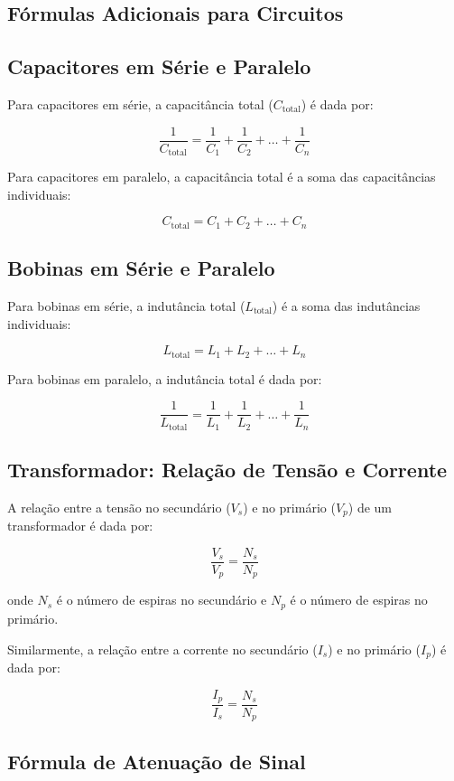 \documentclass{article}
\begin{document}
\begin{itemize}
    \section*{Fórmulas Adicionais para Circuitos}

\subsection*{Capacitores em Série e Paralelo}

Para capacitores em série, a capacitância total (\(C_{\text{total}}\)) é dada por:

\[
\frac{1}{{C_{\text{total}}}} = \frac{1}{{C_1}} + \frac{1}{{C_2}} + \ldots + \frac{1}{{C_n}}
\]

Para capacitores em paralelo, a capacitância total é a soma das capacitâncias individuais:

\[
C_{\text{total}} = C_1 + C_2 + \ldots + C_n
\]

\subsection*{Bobinas em Série e Paralelo}

Para bobinas em série, a indutância total (\(L_{\text{total}}\)) é a soma das indutâncias individuais:

\[
L_{\text{total}} = L_1 + L_2 + \ldots + L_n
\]

Para bobinas em paralelo, a indutância total é dada por:

\[
\frac{1}{{L_{\text{total}}}} = \frac{1}{{L_1}} + \frac{1}{{L_2}} + \ldots + \frac{1}{{L_n}}
\]

\subsection*{Transformador: Relação de Tensão e Corrente}

A relação entre a tensão no secundário (\(V_s\)) e no primário (\(V_p\)) de um transformador é dada por:

\[
\frac{{V_s}}{{V_p}} = \frac{{N_s}}{{N_p}}
\]

onde \(N_s\) é o número de espiras no secundário e \(N_p\) é o número de espiras no primário.

Similarmente, a relação entre a corrente no secundário (\(I_s\)) e no primário (\(I_p\)) é dada por:

\[
\frac{{I_p}}{{I_s}} = \frac{{N_s}}{{N_p}}
\]

\subsection*{Fórmula de Atenuação de Sinal}


\end{itemize}
\end{document}
